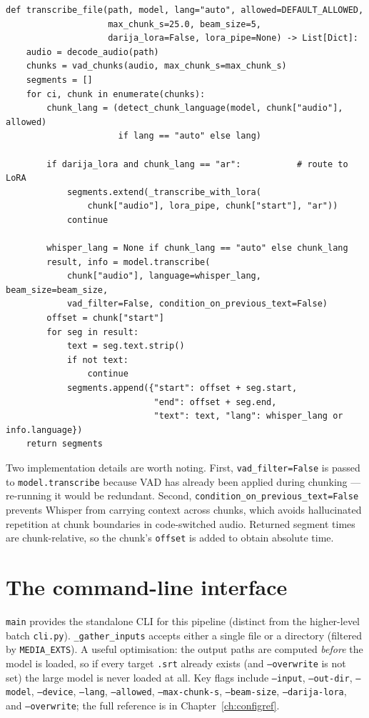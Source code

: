 \documentclass[11pt,a4paper]{report}
\newcommand{\code}[1]{\texttt{\small #1}}
\begin{document}
\begin{lstlisting}[caption={\texttt{transcribe\_file} signature and core loop.}]
def transcribe_file(path, model, lang="auto", allowed=DEFAULT_ALLOWED,
                    max_chunk_s=25.0, beam_size=5,
                    darija_lora=False, lora_pipe=None) -> List[Dict]:
    audio = decode_audio(path)
    chunks = vad_chunks(audio, max_chunk_s=max_chunk_s)
    segments = []
    for ci, chunk in enumerate(chunks):
        chunk_lang = (detect_chunk_language(model, chunk["audio"], allowed)
                      if lang == "auto" else lang)

        if darija_lora and chunk_lang == "ar":           # route to LoRA
            segments.extend(_transcribe_with_lora(
                chunk["audio"], lora_pipe, chunk["start"], "ar"))
            continue

        whisper_lang = None if chunk_lang == "auto" else chunk_lang
        result, info = model.transcribe(
            chunk["audio"], language=whisper_lang, beam_size=beam_size,
            vad_filter=False, condition_on_previous_text=False)
        offset = chunk["start"]
        for seg in result:
            text = seg.text.strip()
            if not text:
                continue
            segments.append({"start": offset + seg.start,
                             "end": offset + seg.end,
                             "text": text, "lang": whisper_lang or info.language})
    return segments
\end{lstlisting}

Two implementation details are worth noting. First, \code{vad\_filter=False} is
passed to \code{model.transcribe} because VAD has already been applied during
chunking --- re-running it would be redundant. Second,
\code{condition\_on\_previous\_text=False} prevents Whisper from carrying context
across chunks, which avoids hallucinated repetition at chunk boundaries in
code-switched audio. Returned segment times are chunk-relative, so the chunk's
\code{offset} is added to obtain absolute time.

\section{The command-line interface}

\code{main} provides the standalone CLI for this pipeline (distinct from the
higher-level batch \code{cli.py}). \code{\_gather\_inputs} accepts either a single
file or a directory (filtered by \code{MEDIA\_EXTS}). A useful optimisation: the
output paths are computed \emph{before} the model is loaded, so if every target
\code{.srt} already exists (and \code{--overwrite} is not set) the large model is
never loaded at all. Key flags include \code{--input}, \code{--out-dir},
\code{--model}, \code{--device}, \code{--lang}, \code{--allowed},
\code{--max-chunk-s}, \code{--beam-size}, \code{--darija-lora}, and
\code{--overwrite}; the full reference is in Chapter~\ref{ch:configref}.
\end{document}

